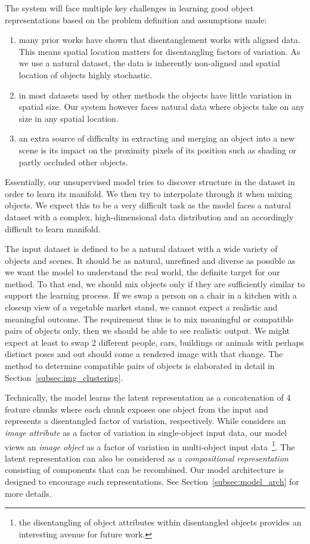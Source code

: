 \documentclass[12pt,a4paper]{article}
\begin{document}
The system will face multiple key challenges in learning good object representations based on the problem definition and assumptions made:
\begin{enumerate}
  \item many prior works have shown that disentanglement works with aligned data. This means spatial location matters for disentangling factors of variation. As we use a natural dataset, the data is inherently non-aligned and spatial location of objects highly stochastic.
  \item  in most datasets used by other methods the objects have little variation in spatial size. Our system however faces natural data where objects take on any size in any spatial location.
  \item an extra source of difficulty in extracting and merging an object into a new scene is its impact on the proximity pixels of its position such as shading or partly occluded other objects.
\end{enumerate}
Essentially, our unsupervised model tries to discover structure in the dataset in order to learn its manifold. We then try to interpolate through it when mixing objects. We expect this to be a very difficult task as the model faces a natural dataset with a complex, high-dimensional data distribution and an accordingly difficult to learn manifold. 

The input dataset is defined to be a natural dataset with a wide variety of objects and scenes. It should be as natural, unrefined and diverse as possible as we want the model to understand the real world, the definite target for our method. To that end, we should mix objects only if they are sufficiently similar to support the learning process. If we swap a person on a chair in a kitchen with a closeup view of a vegetable market stand, we cannot expect a realistic and meaningful outcome. The requirement thus is to mix meaningful or compatible pairs of objects only, then we should be able to see realistic output. We might expect at least to swap 2 different people, cars, buildings or animals with perhaps distinct poses and out should come a rendered image with that change. The method to determine compatible pairs of objects is elaborated in detail in Section~\ref{subsec:img_clustering}. 

Technically, the model learns the latent representation as a concatenation of 4 feature chunks where each chunk exposes one object from the input and represents a disentangled factor of variation, respectively. While \cite{DisentFacOfVarByMixTh} considers an \textit{image attribute} as a factor of variation in single-object input data, our model views an \textit{image object} as a factor of variation in multi-object input data~\footnote{the disentangling of object attributes within disentangled objects provides an interesting avenue for future work.}. The latent representation can also be considered as a \textit{compositional representation}~\cite{SpatialBDecoder} consisting of components that can be recombined. %
Our model architecture is designed to encourage such representations. See Section~\ref{subsec:model_arch} for more details. 
\end{document}
